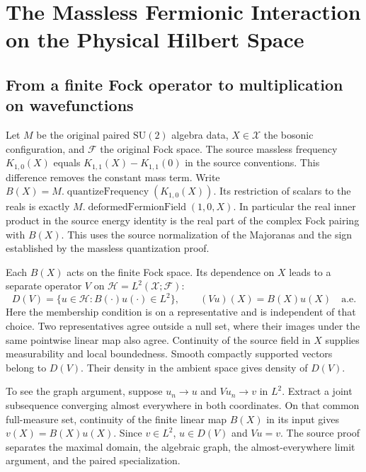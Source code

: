\chapter[The Physical Massless Multiplier]{The Massless Fermionic Interaction on the Physical Hilbert Space}
\label{ch:massless-multiplier}

\section{From a finite Fock operator to multiplication on wavefunctions}
Let \(M\) be the original paired \(\mathrm{SU}(2)\) algebra data,
\(X\in\mathcal X\) the bosonic configuration, and \(\mathcal F\)
the original Fock space. The source massless frequency
\(K_{1,0}(X)\) equals \(K_{1,1}(X)-K_{1,1}(0)\) in the
source conventions. This difference removes the constant mass term.
Write \(B(X)=M.\operatorname{quantizeFrequency}(K_{1,0}(X))\).
Its restriction of scalars to the reals is exactly
\(M.\operatorname{deformedFermionField}(1,0,X)\). In particular
the real inner product in the source energy identity is the real
part of the complex Fock pairing with \(B(X)\). This uses the
source normalization of the Majoranas and the sign established
by the massless quantization proof.

Each \(B(X)\) acts on the finite Fock space. Its dependence on \(X\)
leads to a separate operator \(V\) on
\(\mathcal H=L^2(\mathcal X;\mathcal F)\):
\[
 D(V)=\{u\in\mathcal H:B(\cdot)u(\cdot)\in L^2\},
 \qquad (Vu)(X)=B(X)u(X)\quad\text{a.e.}
\]
Here the membership condition is on a representative and is independent
of that choice. Two representatives agree outside a null set, where
their images under the same pointwise linear map also agree.
Continuity of the source field in \(X\) supplies measurability and
local boundedness. Smooth compactly supported vectors belong to
\(D(V)\). Their density in the ambient space gives density of \(D(V)\).

To see the graph argument, suppose \(u_n\to u\) and \(Vu_n\to v\) in
\(L^2\). Extract a joint subsequence converging almost everywhere in
both coordinates. On that common full-measure set, continuity of the
finite linear map \(B(X)\) in its input gives
\(v(X)=B(X)u(X)\). Since \(v\in L^2\), \(u\in D(V)\) and \(Vu=v\).
The source proof separates the maximal domain, the algebraic graph,
the almost-everywhere limit argument, and the paired specialization.

